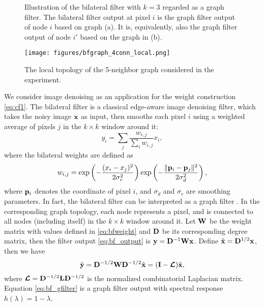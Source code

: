 \documentclass{article}
\begin{document}
\begin{figure}
\centering
{}%
\caption{Illustration of the bilateral filter with $k=3$ regarded as a graph filter. The bilateral filter output at pixel $i$ is the graph filter output of node $i$ based on graph (a). It is, equivalently, also the graph filter output of node $i'$ based on the graph in (b).}
\label{fig:bflocal}
\end{figure}
\begin{figure}
\centering
\texttt{[image: figures/bfgraph\_4conn\_local.png]}
\vspace{.1cm}
\caption{The local topology of the 5-neighbor graph considered in the experiment.}
\label{fig:bflocal_4conn}
\end{figure}

We consider image denoising as an application for the weight construction \eqref{eq:cf1}. The bilateral filter \cite{Tomasi1998} is a classical edge-aware image denoising filter, which takes the noisy image ${\bf x}$ as input, then smooths each pixel $i$ using a weighted average of pixels $j$ in the $k\times k$ window around it:
\begin{equation}
\label{eq:bf_output}
  y_i=\sum_j\frac{w_{i,j}}{\sum_i w_{i,j}}x_i,
\end{equation}
where the bilateral weights are defined as
\begin{equation}
\label{eq:bfweight}
  w_{i,j}=\exp\left(-\frac{(x_i-x_j)^2}{2\sigma_r^2}\right)\exp\left(-\frac{\|{\bf p}_i-{\bf p}_j\|^2}{2\sigma_d^2}\right),
\end{equation}
where ${\bf p}_i$ denotes the coordinate of pixel $i$, and $\sigma_d$ and $\sigma_r$ are smoothing parameters. 
In fact, the bilateral filter can be interpreted as a graph filter \cite{Gadde2013}. In the corresponding graph topology, each node represents a pixel, and is connected to all nodes (including itself) in the $k\times k$ window around it. Let ${\bf W}$ be the weight matrix with values defined in \eqref{eq:bfweight} and ${\bf D}$ be its corresponding degree matrix, then the filter output \eqref{eq:bf_output} is ${\bf y}={\bf D}^{-1}{\bf W}{\bf x}$. Define $\hat{{\bf x}}={\bf D}^{1/2}{\bf x}$, then we have 
\begin{equation} 
\label{eq:bf_gfilter}
  \hat{{\bf y}}={\bf D}^{-1/2}{\bf W}{\bf D}^{-1/2}\hat{{\bf x}}=({\bf I}-\hbox{\boldmath${\cal L}$})\hat{{\bf x}}, 
\end{equation}
where $\hbox{\boldmath${\cal L}$}={\bf D}^{-1/2}{\bf L}{\bf D}^{-1/2}$ is the normalized combinatorial Laplacian matrix. Equation \eqref{eq:bf_gfilter} is a graph filter output with spectral response $h(\lambda)=1-\lambda$. 
\end{document}
